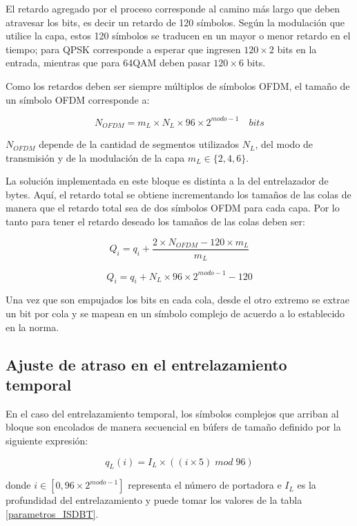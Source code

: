 \documentclass[journal,comsoc]{IEEEtran}
\begin{document}
El retardo agregado por el proceso corresponde al camino más largo que deben atravesar los bits, es decir un retardo de 120 símbolos. Según
la modulación que utilice la capa, estos 120 símbolos se traducen en un mayor o menor retardo en el tiempo; para QPSK corresponde a esperar que ingresen $120 \times 2$ bits en la entrada, mientras que para 64QAM deben pasar $120 \times 6$ bits.

Como los retardos deben ser siempre múltiplos de símbolos OFDM, el tamaño de un símbolo OFDM corresponde a:

\begin{equation}
N_{OFDM} = m_L \times N_L \times 96 \times 2^{modo - 1} \quad bits
\end{equation}

$N_{OFDM}$ depende de la cantidad de segmentos utilizados $N_L$, del modo de transmisión y de la modulación de la capa $m_L \in \{2,4,6\}$.

La solución implementada en este bloque es distinta a la del entrelazador de bytes. Aquí, el retardo total se obtiene incrementando los tamaños de las colas de manera que el retardo total sea de dos símbolos OFDM para cada capa. Por lo tanto para tener el retardo deseado los tamaños de las colas deben ser:

\begin{equation}
Q_i = q_i + \dfrac{2 \times N_{OFDM} -120 \times m_L}{m_L}
\end{equation}


\begin{equation}
Q_i = q_i +  N_L \times 96 \times 2^{modo - 1} - 120
\end{equation}

Una vez que son empujados los bits en cada cola, desde el otro extremo se extrae un bit por cola y se mapean en un símbolo complejo de acuerdo a lo establecido en la norma.

\subsection{Ajuste de atraso en el entrelazamiento temporal}
En el caso del entrelazamiento temporal, los símbolos complejos que arriban al bloque son encolados de manera secuencial en búfers de tamaño definido por la siguiente expresión:

\begin{equation}
q_L(i) = I_L \times ((i \times 5) \; mod \; 96)
\end{equation}

\noindent donde $i \in [0, 96 \times 2^{modo-1}]$ representa el número de portadora e $I_L$ es la profundidad del entrelazamiento y puede tomar los valores de la tabla \ref{parametros_ISDBT}.
\end{document}
